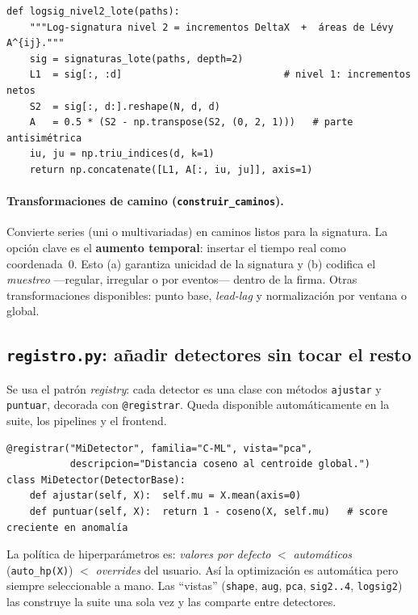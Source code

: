 \documentclass[11pt,a4paper]{article}
\begin{document}
\begin{lstlisting}
def logsig_nivel2_lote(paths):
    """Log-signatura nivel 2 = incrementos DeltaX  +  áreas de Lévy A^{ij}."""
    sig = signaturas_lote(paths, depth=2)
    L1  = sig[:, :d]                            # nivel 1: incrementos netos
    S2  = sig[:, d:].reshape(N, d, d)
    A   = 0.5 * (S2 - np.transpose(S2, (0, 2, 1)))   # parte antisimétrica
    iu, ju = np.triu_indices(d, k=1)
    return np.concatenate([L1, A[:, iu, ju]], axis=1)
\end{lstlisting}

\paragraph{Transformaciones de camino (\texttt{construir\_caminos}).}
Convierte series (uni o multivariadas) en caminos listos para la signatura.
La opción clave es el \textbf{aumento temporal}: insertar el tiempo real como
coordenada~0. Esto (a) garantiza unicidad de la signatura y (b) codifica el
\emph{muestreo} ---regular, irregular o por eventos--- dentro de la firma. Otras
transformaciones disponibles: punto base, \emph{lead-lag} y normalización por
ventana o global.

\subsection{\texttt{registro.py}: añadir detectores sin tocar el resto}

Se usa el patrón \emph{registry}: cada detector es una clase con métodos
\texttt{ajustar} y \texttt{puntuar}, decorada con \texttt{@registrar}. Queda
disponible automáticamente en la suite, los pipelines y el frontend.

\begin{lstlisting}
@registrar("MiDetector", familia="C-ML", vista="pca",
           descripcion="Distancia coseno al centroide global.")
class MiDetector(DetectorBase):
    def ajustar(self, X):  self.mu = X.mean(axis=0)
    def puntuar(self, X):  return 1 - coseno(X, self.mu)   # score creciente en anomalía
\end{lstlisting}

\noindent La política de hiperparámetros es:
\emph{valores por defecto} $<$ \emph{automáticos} (\texttt{auto\_hp(X)}) $<$
\emph{overrides} del usuario. Así la optimización es automática pero siempre
seleccionable a mano. Las ``vistas'' (\texttt{shape}, \texttt{aug},
\texttt{pca}, \texttt{sig2..4}, \texttt{logsig2}) las construye la suite una
sola vez y las comparte entre detectores.
\end{document}
